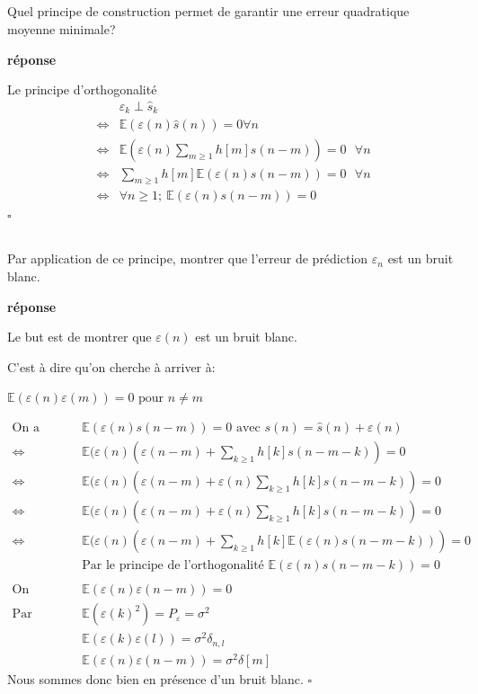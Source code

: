 \documentclass{article}
\newcommand{\debutrep}[1]{\color{blue}\begin{center} \hrulefill \textbf{ #1 } \hrulefill \end{center} }
\newcommand{\finrep}{\vspace*{5mm}\hfill $\square$\color{black}\vspace*{5mm}}
\begin{document}
\subsection{}
Quel principe de construction  permet de garantir une erreur quadratique moyenne minimale? \\

\debutrep{réponse}
Le principe d'orthogonalité
\[
\begin{split}
    & \varepsilon_k \perp \hat{s}_k \\
    \Longleftrightarrow & \mathbb{E}(\varepsilon(n)\hat{s}(n)) = 0 \forall n \\
    \Longleftrightarrow & \mathbb{E}(\varepsilon(n)\sum_{m\ge1}h[m]s(n-m)) = 0 \ \ \ \forall n \\
    \Longleftrightarrow & \sum_{m\ge1}h[m]\mathbb{E}(\varepsilon(n)s(n-m)) = 0 \ \ \ \forall n \\
    \Longleftrightarrow & \forall n \ge 1; \ \mathbb{E}(\varepsilon(n)s(n-m))=0
\end{split}
\]
\finrep

\subsection{}
Par application de ce principe, montrer que l'erreur de prédiction $\varepsilon_n$ est  un bruit blanc.\\

\debutrep{réponse}
Le but est de montrer que $\varepsilon(n)$ est un bruit blanc.

C'est à dire qu'on cherche à arriver à:

$\mathbb{E}(\varepsilon(n)\varepsilon(m))=0 \text{ pour } n \ne m$

\[
\begin{split}
    \text{On a } & \mathbb{E} (\varepsilon(n)s(n-m))=0 \text{ avec } s(n) = \hat{s}(n)+\varepsilon(n) \\
    \Longleftrightarrow \  & \mathbb{E}(\varepsilon(n)(\varepsilon(n-m)+\sum_{k\geq1}^{}h[k]s(n-m-k))=0\\
    \Longleftrightarrow \ & \mathbb{E}(\varepsilon(n)(\varepsilon(n-m)+\varepsilon(n)\sum_{k\geq1}^{}h[k]s(n-m-k))=0\\
    \Longleftrightarrow \ & \mathbb{E}(\varepsilon(n)(\varepsilon(n-m)+\varepsilon(n)\sum_{k\geq1}^{}h[k]s(n-m-k))=0\\
    \Longleftrightarrow \ & \mathbb{E}(\varepsilon(n)(\varepsilon(n-m)+\sum_{k\geq1}^{}h[k]\mathbb{E}(\varepsilon(n)s(n-m-k)))=0\\
    & \text{Par le principe de l'orthogonalité } \mathbb{E}(\varepsilon(n)s(n-m-k))=0\\
    \\
    \text{On obtient alors: } & \mathbb{E}(\varepsilon(n)\varepsilon(n-m))=0\\
    \text{Par définition: } & \mathbb{E}(\varepsilon(k)^2)=P_\varepsilon = \sigma^2 \\
    & \mathbb{E}(\varepsilon(k)\varepsilon(l))=\sigma^2\delta_{n,l} \\
    & \mathbb{E}(\varepsilon(n)\varepsilon(n-m))=\sigma^2\delta[m]
\end{split}
\]
Nous sommes donc bien en présence d'un bruit blanc.
\finrep
\end{document}
